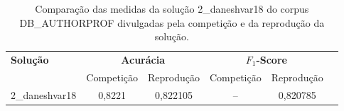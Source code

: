 \begin{table}[!thb]
    \centering
    \caption{Comparação das medidas da solução 2\_daneshvar18 do corpus DB\_AUTHORPROF divulgadas pela competição e da reprodução da solução.}
    \begin{adjustbox}{max width={\textwidth},keepaspectratio}%
    \begin{tabular}{|l|c|c|c|c|c|}
        \hline
        \multirow{2}{*}{\textbf{Solução}}
        & \multicolumn{2}{|c|}{\textbf{Acurácia}}
        & \multicolumn{2}{|c|}{\textbf{$F_1$-Score}}
        \\ \cline{2-5}    
        & Competição    & Reprodução
        & Competição    & Reprodução 
        \\ \hline
        2\_daneshvar18        
        & 0,8221        & 0,822105	
        & --            & 0,820785
        \\ 
        \hline
    \end{tabular}
    \end{adjustbox}
    \\
    \label{tab:reprodução-db-authorprof} 
\end{table}
